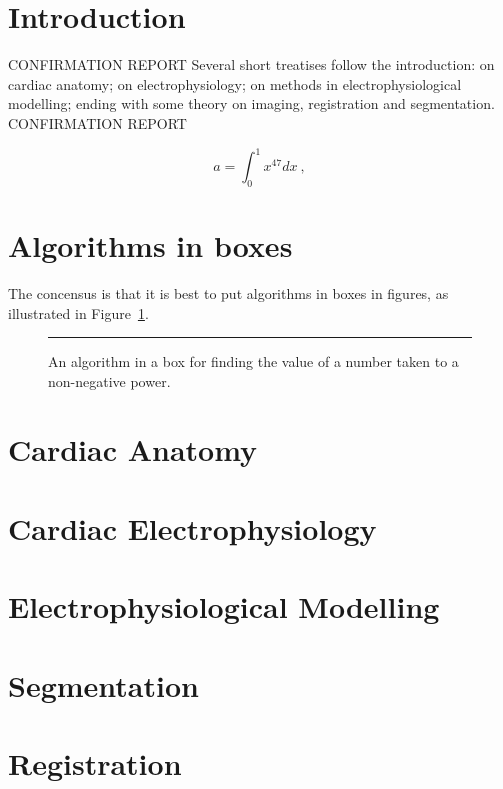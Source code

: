
\section{Introduction}
\label{sec:review:introduction}
CONFIRMATION REPORT
Several short treatises follow the introduction: on cardiac anatomy; on electrophysiology; on methods in electrophysiological modelling; ending with some theory on imaging, registration and segmentation.
CONFIRMATION REPORT



\begin{equation}
\label{eq:review:rubbish}
a = \int_{0}^{1} x^{47} dx ~,
\end{equation}

\section{Algorithms in boxes}
The concensus is that it is best to put algorithms in boxes in
figures, as illustrated in Figure~\ref{fig:review:alg1}.

\begin{figure}
\centerline{}
\caption{\label{fig:review:alg1}
An algorithm in a box for finding the value of a number taken to a
non-negative power.}
\hrule
\end{figure}

\section{Cardiac Anatomy}
\section{Cardiac Electrophysiology}
\section{Electrophysiological Modelling}
\section{Segmentation}
\section{Registration}
